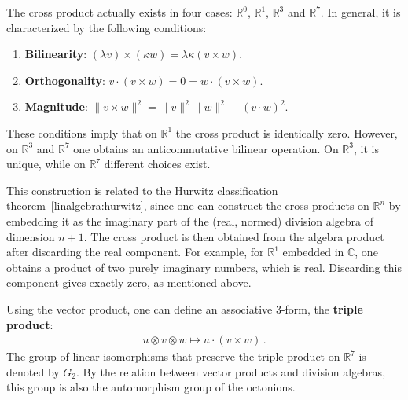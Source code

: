     \begin{remark}
        The cross product actually exists in four cases: $\mathbb{R}^0$, $\mathbb{R}^1$, $\mathbb{R}^3$ and $\mathbb{R}^7$. In general, it is characterized by the following conditions:
        \begin{enumerate}
            \item\textbf{Bilinearity}: $(\lambda v)\times(\kappa w) = \lambda\kappa(v\times w)$.
            \item\textbf{Orthogonality}: $v\cdot(v\times w)=0=w\cdot(v\times w)$.
            \item\textbf{Magnitude}: $\|v\times w\|^2 = \|v\|^2\|w\|^2 - (v\cdot w)^2$.
        \end{enumerate}
        These conditions imply that on $\mathbb{R}^1$ the cross product is identically zero. However, on $\mathbb{R}^3$ and $\mathbb{R}^7$ one obtains an anticommutative bilinear operation. On $\mathbb{R}^3$, it is unique, while on $\mathbb{R}^7$ different choices exist.

        This construction is related to the Hurwitz classification theorem~\ref{linalgebra:hurwitz}, since one can construct the cross products on $\mathbb{R}^n$ by embedding it as the imaginary part of the (real, normed) division algebra of dimension $n+1$. The cross product is then obtained from the algebra product after discarding the real component. For example, for $\mathbb{R}^1$ embedded in  $\mathbb{C}$, one obtains a product of two purely imaginary numbers, which is real. Discarding this component gives exactly zero, as mentioned above.
    \end{remark}

    \begin{property}
        Using the vector product, one can define an associative 3-form, the \textbf{triple product}:
        \begin{gather}
            u\otimes v\otimes w\mapsto u\cdot(v\times w)\,.
        \end{gather}
        The group of linear isomorphisms that preserve the triple product on $\mathbb{R}^7$ is denoted by $G_2$. By the relation between vector products and division algebras, this group is also the automorphism group of the octonions.
    \end{property}

